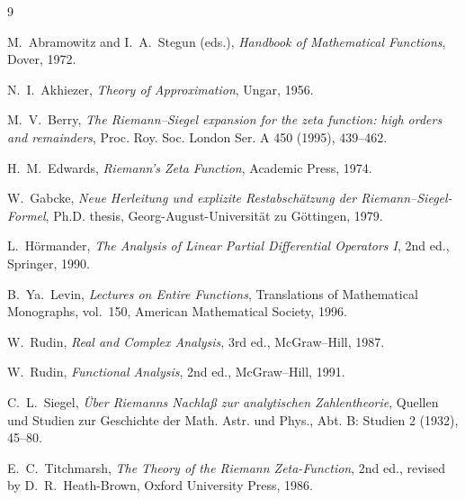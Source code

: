 \documentclass[11pt]{article}
\begin{document}
\begin{thebibliography}{9}

M.~Abramowitz and I.~A.~Stegun (eds.), \emph{Handbook of Mathematical Functions}, Dover, 1972.

N.~I.~Akhiezer, \emph{Theory of Approximation}, Ungar, 1956.

M.~V.~Berry, \emph{The Riemann--Siegel expansion for the zeta function: high orders and remainders}, Proc. Roy. Soc. London Ser. A 450 (1995), 439--462.

H.~M.~Edwards, \emph{Riemann's Zeta Function}, Academic Press, 1974.

W.~Gabcke, \emph{Neue Herleitung und explizite Restabsch\"atzung der Riemann--Siegel-Formel}, Ph.D. thesis, Georg-August-Universit\"at zu G\"ottingen, 1979.

L.~H\"ormander, \emph{The Analysis of Linear Partial Differential Operators I}, 2nd ed., Springer, 1990.

B.~Ya.~Levin, \emph{Lectures on Entire Functions}, Translations of Mathematical Monographs, vol.~150, American Mathematical Society, 1996.

W.~Rudin, \emph{Real and Complex Analysis}, 3rd ed., McGraw--Hill, 1987.

W.~Rudin, \emph{Functional Analysis}, 2nd ed., McGraw--Hill, 1991.

C.~L.~Siegel, \emph{\"Uber Riemanns Nachla{\ss} zur analytischen Zahlentheorie}, Quellen und Studien zur Geschichte der Math. Astr. und Phys., Abt. B: Studien 2 (1932), 45--80.

E.~C.~Titchmarsh, \emph{The Theory of the Riemann Zeta-Function}, 2nd ed., revised by D.~R.~Heath-Brown, Oxford University Press, 1986.

\end{thebibliography}
\end{document}
